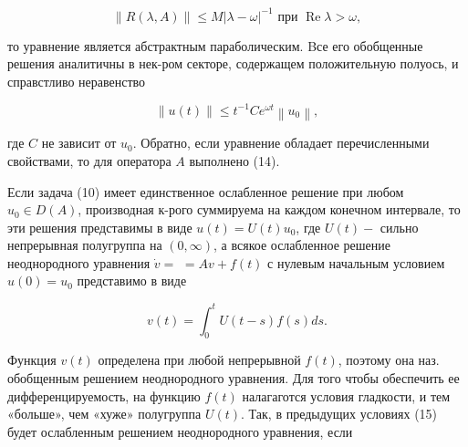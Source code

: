 \documentclass[10pt]{article}
\begin{document}
\[

\|R(\lambda, A)\| \leqslant M|\lambda-\omega|^{-1} \text { при } \operatorname{Re} \lambda>\omega,

\]



то уравнение является абстрактным параболическим. Bсе его обобщенные решения аналитичны в нек-ром секторе, содержащем положительную полуось, и справстливо неравенство



\[

\|u(t)\| \leqslant t^{-1} C e^{\omega t}\left\|u_{0}\right\|,

\]



где $C$ не зависит от $u_{0}$. Обратно, если уравнение обладает перечисленными свойствами, то для оператора $A$ выполнено (14).



Если задача (10) имеет единственное ослабленное решение при любом $u_{0} \in D(A)$, производная к-рого суммируема на каждом конечном интервале, то эти решения представимы в виде $u(t)=U(t) u_{0}$, где $U(t)-$ сильно непрерывная полугруппа на $(0, \infty)$, а всякое ослабленное решение неоднородного уравнения $\dot{v}=$ $=A v+f(t)$ с нулевым начальным условием $u(0)=u_{0}$ представимо в виде



\[

v(t)=\int_{0}^{t} U(t-s) f(s) d s .

\]



Функция $v(t)$ определена при любой непрерывной $f(t)$, поэтому она наз. обобщенным решением неоднородного уравнения. Для того чтобы обеспечить ее дифференцируемость, на функцию $f(t)$ налагаготся условия гладкости, и тем «больше», чем «хуже» полугруппа $U(t)$. Так, в предыдущих условиях (15) будет ослабленным решением неоднородного уравнения, если
\end{document}
